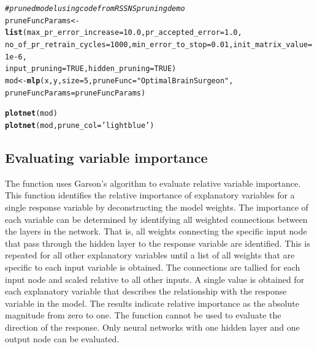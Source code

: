 \documentclass[article,shortnames]{jss}\usepackage[]{graphicx}\usepackage[]{color}
\makeatletter
\newcommand{\hlnum}[1]{\textcolor[rgb]{0.686,0.059,0.569}{#1}}%
\newcommand{\hlstr}[1]{\textcolor[rgb]{0.192,0.494,0.8}{#1}}%
\newcommand{\hlcom}[1]{\textcolor[rgb]{0.678,0.584,0.686}{\textit{#1}}}%
\newcommand{\hlstd}[1]{\textcolor[rgb]{0.345,0.345,0.345}{#1}}%
\newcommand{\hlkwb}[1]{\textcolor[rgb]{0.69,0.353,0.396}{#1}}%
\newcommand{\hlkwc}[1]{\textcolor[rgb]{0.333,0.667,0.333}{#1}}%
\newcommand{\hlkwd}[1]{\textcolor[rgb]{0.737,0.353,0.396}{\textbf{#1}}}%
\newenvironment{kframe}{%
 \def\at@end@of@kframe{}%
 \ifinner\ifhmode%
  \def\at@end@of@kframe{\end{minipage}}%
  \begin{minipage}{\columnwidth}%
 \fi\fi%
 \def\FrameCommand##1{\hskip\@totalleftmargin \hskip-\fboxsep
 \colorbox{shadecolor}{##1}\hskip-\fboxsep
     \hskip-\linewidth \hskip-\@totalleftmargin \hskip\columnwidth}%
 \MakeFramed {\advance\hsize-\width
   \@totalleftmargin\z@ \linewidth\hsize
   \@setminipage}}%
 {\par\unskip\endMakeFramed%
 \at@end@of@kframe}
\makeatother
\begin{document}
\begin{kframe}
\begin{alltt}
\hlcom{# pruned model using code from RSSNS pruning demo}
\hlstd{pruneFuncParams} \hlkwb{<-} \hlkwd{list}\hlstd{(}\hlkwc{max_pr_error_increase} \hlstd{=} \hlnum{10.0}\hlstd{,} \hlkwc{pr_accepted_error} \hlstd{=} \hlnum{1.0}\hlstd{,}
 \hlkwc{no_of_pr_retrain_cycles} \hlstd{=} \hlnum{1000}\hlstd{,} \hlkwc{min_error_to_stop} \hlstd{=} \hlnum{0.01}\hlstd{,} \hlkwc{init_matrix_value} \hlstd{=} \hlnum{1e-6}\hlstd{,}
 \hlkwc{input_pruning} \hlstd{=} \hlnum{TRUE}\hlstd{,} \hlkwc{hidden_pruning} \hlstd{=} \hlnum{TRUE}\hlstd{)}
\hlstd{mod} \hlkwb{<-} \hlkwd{mlp}\hlstd{(x, y,} \hlkwc{size} \hlstd{=} \hlnum{5}\hlstd{,} \hlkwc{pruneFunc} \hlstd{=} \hlstr{"OptimalBrainSurgeon"}\hlstd{,}
 \hlkwc{pruneFuncParams} \hlstd{= pruneFuncParams)}

\hlkwd{plotnet}\hlstd{(mod)}
\hlkwd{plotnet}\hlstd{(mod,} \hlkwc{prune_col} \hlstd{=} \hlstr{'lightblue'}\hlstd{)}
\end{alltt}
\end{kframe}

\subsection{Evaluating variable importance}

The  function uses Garson's algorithm to evaluate relative variable importance. This function identifies the relative importance of explanatory variables for a single response variable by deconstructing the model weights. The importance of each variable can be determined by identifying all weighted connections between the layers in the network. That is, all weights connecting the specific input node that pass through the hidden layer to the response variable are identified. This is repeated for all other explanatory variables until a list of all weights that are specific to each input variable is obtained. The connections are tallied for each input node and scaled relative to all other inputs. A single value is obtained for each explanatory variable that describes the relationship with the response variable in the model. The results indicate relative importance as the absolute magnitude from zero to one. The function cannot be used to evaluate the direction of the response. Only neural networks with one hidden layer and one output node can be evaluated.
\end{document}
